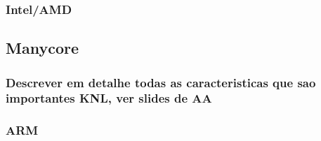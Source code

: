 \subsubsection{Intel/AMD}

\subsection{Manycore}
\subsubsection{Descrever em detalhe todas as caracteristicas que sao importantes KNL, ver slides de AA}
\subsubsection{ARM}




